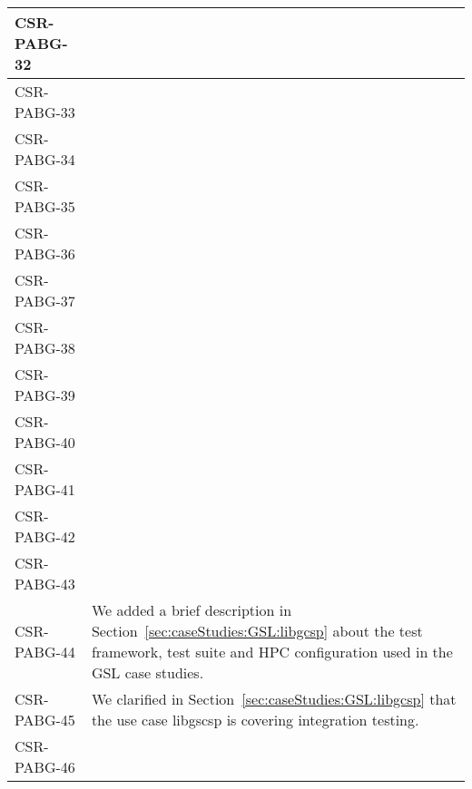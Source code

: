 \begin{longtable}{|p{1.5cm}|p{12cm}|@{}}
\hline
CSR-PABG-32&
\begin{minipage}{12cm}
\end{minipage}\\
\hline
CSR-PABG-33&
\begin{minipage}{12cm}
\end{minipage}\\
\hline
CSR-PABG-34&
\begin{minipage}{12cm}
\end{minipage}\\
\hline
CSR-PABG-35&
\begin{minipage}{12cm}
\end{minipage}\\
\hline
CSR-PABG-36&
\begin{minipage}{12cm}
\end{minipage}\\
\hline
CSR-PABG-37&
\begin{minipage}{12cm}
\end{minipage}\\
\hline
CSR-PABG-38&
\begin{minipage}{12cm}
\end{minipage}\\
\hline
CSR-PABG-39&
\begin{minipage}{12cm}
\end{minipage}\\
\hline
CSR-PABG-40&
\begin{minipage}{12cm}
\end{minipage}\\
\hline
CSR-PABG-41&
\begin{minipage}{12cm}
\end{minipage}\\
\hline
CSR-PABG-42&
\begin{minipage}{12cm}
\end{minipage}\\
\hline
CSR-PABG-43&
\begin{minipage}{12cm}
\end{minipage}\\
\hline
CSR-PABG-44&
\begin{minipage}{12cm}
We added a brief description in Section~\ref{sec:caseStudies:GSL:libgcsp} about the test framework, test suite and HPC configuration used in the GSL case studies.
\end{minipage}\\
\hline
CSR-PABG-45&
\begin{minipage}{12cm}
We clarified in Section~\ref{sec:caseStudies:GSL:libgcsp} that the use case libgscsp is covering integration testing.
\end{minipage}\\
\hline
CSR-PABG-46&
\begin{minipage}{12cm}


\end{minipage}
\end{longtable}
